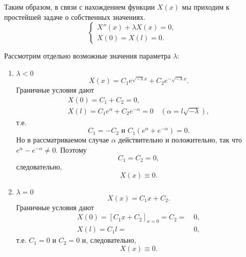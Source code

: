 Таким образом, в связи с нахождением функции $X(x)$ мы приходим к простейшей задаче о собственных значениях.
\begin{equation} \label{euigen}
	\begin{cases} 
		X''(x) + \lambda X(x) = 0, \\
		X(0) = X(l) = 0.
	\end{cases}
\end{equation}

Рассмотрим отдельно возможные значения параметра $\lambda$:
\begin{enumerate}
	\item $\lambda < 0$
	\begin{equation*}
		X(x) = C_1 e^{\sqrt{- \lambda} x} + C_2 e^{-\sqrt{- \lambda} x}.
	\end{equation*}
	Граничные условия дают
	\begin{align*}
		X(0) = C_1 + C_2 = 0, \\
		X(l) = C_1 e^{\alpha} + C_2 e^{-\alpha} = 0 \quad (\alpha = l\sqrt{-\lambda}),
	\end{align*}
	т.е. 
	\begin{equation*}
		C_1 = - C_2 \text{ и } C_1(e^{\alpha} + e^{-\alpha}) = 0.
	\end{equation*}
	Но в рассматриваемом случае $\alpha$ действительно и положительно, так что $e^{\alpha} - e^{-\alpha} \not = 0$. Поэтому 
	\begin{equation*}
		C_1 = C_2 = 0,
	\end{equation*}
	следовательно, 
	\begin{equation*}
		X(x) \equiv 0.
	\end{equation*}
	
	\item $\lambda = 0$
	\begin{equation*}
		X(x) = C_1 x + C_2.
	\end{equation*}
	Граничные условия дают
	\begin{align*}
		X(0) = [C_1 x + C_2]_{x = 0} = C_2 = &~0, \\
		X(l) = C_1 l = &~0,
	\end{align*}
	т.е. $C_1 = 0$ и $C_2 = 0$ и, следовательно, 
	\begin{equation*}
		X(x) \equiv 0. 
	\end{equation*}
	

\end{enumerate}
